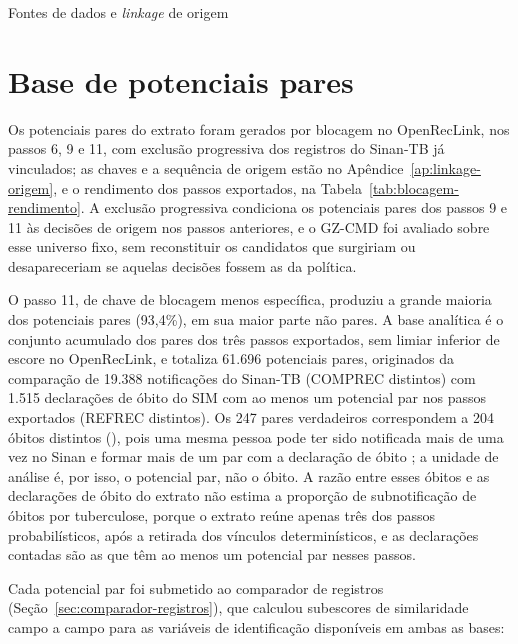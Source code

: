 \begin{chapter}{Fontes de dados e \textit{linkage} de origem}
\section{Base de potenciais pares}\label{sec:base-pares}

Os potenciais pares do extrato foram gerados por blocagem no OpenRecLink, nos passos 6, 9 e 11, com exclusão progressiva dos registros do Sinan-TB já vinculados; as chaves e a sequência de origem estão no Apêndice~\ref{ap:linkage-origem}, e o rendimento dos passos exportados, na Tabela~\ref{tab:blocagem-rendimento}. A exclusão progressiva condiciona os potenciais pares dos passos 9 e 11 às decisões de origem nos passos anteriores, e o GZ-CMD foi avaliado sobre esse universo fixo, sem reconstituir os candidatos que surgiriam ou desapareceriam se aquelas decisões fossem as da política.

O passo 11, de chave de blocagem menos específica, produziu a grande maioria dos potenciais pares (93,4\%), em sua maior parte não pares. A base analítica é o conjunto acumulado dos pares dos três passos exportados, sem limiar inferior de escore no OpenRecLink, e totaliza 61.696 potenciais pares, originados da comparação de 19.388 notificações do Sinan-TB (COMPREC distintos) com 1.515 declarações de óbito do SIM com ao menos um potencial par nos passos exportados (REFREC distintos). Os 247 pares verdadeiros correspondem a 204 óbitos distintos (), pois uma mesma pessoa pode ter sido notificada mais de uma vez no Sinan e formar mais de um par com a declaração de óbito \cite[p.~35]{Oliveira2026obitoTBpulmonar}; a unidade de análise é, por isso, o potencial par, não o óbito. A razão entre esses óbitos e as declarações de óbito do extrato não estima a proporção de subnotificação de óbitos por tuberculose, porque o extrato reúne apenas três dos passos probabilísticos, após a retirada dos vínculos determinísticos, e as declarações contadas são as que têm ao menos um potencial par nesses passos.

Cada potencial par foi submetido ao comparador de registros (Seção~\ref{sec:comparador-registros}), que calculou subescores de similaridade campo a campo para as variáveis de identificação disponíveis em ambas as bases:


\end{chapter}
